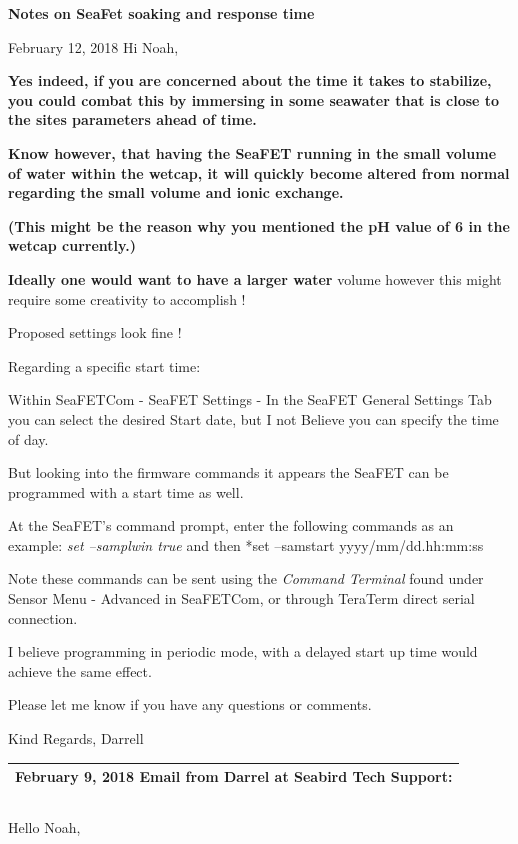 \documentclass[]{book}
\begin{document}
\textbf{Notes on SeaFet soaking and response time}

February 12, 2018 Hi Noah,

\textbf{Yes indeed, if you are concerned about the time it takes to stabilize, you could combat this by immersing in some seawater that is close to the sites parameters ahead of time.}

\textbf{Know however, that having the SeaFET running in the small volume of water within the wetcap, it will quickly become altered from normal regarding the small volume and ionic exchange.}

\textbf{(This might be the reason why you mentioned the pH value of 6 in the wetcap currently.)}

\textbf{Ideally one would want to have a larger water} volume however this might require some creativity to accomplish !

Proposed settings look fine !

Regarding a specific start time:

Within SeaFETCom - SeaFET Settings - In the SeaFET General Settings Tab you can select the desired Start date, but I not Believe you can specify the time of day.

But looking into the firmware commands it appears the SeaFET can be programmed with a start time as well.

At the SeaFET's command prompt, enter the following commands as an example: \emph{set --samplwin true} and then *set --samstart yyyy/mm/dd.hh:mm:ss

Note these commands can be sent using the \emph{Command Terminal} found under Sensor Menu - Advanced in SeaFETCom, or through TeraTerm direct serial connection.

I believe programming in periodic mode, with a delayed start up time would achieve the same effect.

Please let me know if you have any questions or comments.

Kind Regards,
Darrell

\begin{longtable}[]{@{}l@{}}
\toprule
February 9, 2018 Email from Darrel at Seabird Tech Support:\tabularnewline
\midrule
\endhead
\bottomrule
\end{longtable}

\begin{longtable}[]{@{}l@{}}
\toprule
\endhead
\bottomrule
\end{longtable}

Hello Noah,
\end{document}
